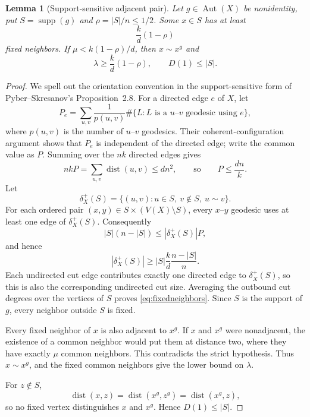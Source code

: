 \documentclass[11pt]{amsart}
\newtheorem{lemma}[theorem]{Lemma}
\theoremstyle{definition}
\newcommand{\supp}{\operatorname{supp}}
\newcommand{\dist}{\operatorname{dist}}
\newcommand{\Aut}{\operatorname{Aut}}
\begin{document}
\begin{lemma}[Support-sensitive adjacent pair]\label{lem:adjacent}
Let $g\in\Aut(X)$ be nonidentity, put $S=\supp(g)$ and $\rho=|S|/n\le1/2$.  Some $x\in S$ has at least
\begin{equation}\label{eq:fixedneighbors}
  \frac{k}{d}(1-\rho)
\end{equation}
fixed neighbors.  If $\mu<k(1-\rho)/d$, then $x\sim x^g$ and
\begin{equation}\label{eq:adjacentconsequences}
  \lambda\ge\frac{k}{d}(1-\rho),
  \qquad D(1)\le|S|.
\end{equation}
\end{lemma}

\begin{proof}
We spell out the orientation convention in the support-sensitive form of Pyber--Skresanov's Proposition~2.8.  For a directed edge $e$ of $X$, let
\[
 P_e=\sum_{u,v}\frac1{p(u,v)}
 \#\{L:L\text{ is a }u\text{--}v\text{ geodesic using }e\},
\]
where $p(u,v)$ is the number of $u$--$v$ geodesics.  Their coherent-configuration argument shows that $P_e$ is independent of the directed edge; write the common value as $P$.  Summing over the $nk$ directed edges gives
\[
 nkP=\sum_{u,v}\dist(u,v)\le dn^2,
 \qquad\text{so}\qquad P\le\frac{dn}{k}.
\]
Let
\[
 \delta_X^+(S)=\{(u,v):u\in S,\ v\notin S,\ u\sim v\}.
\]
For each ordered pair $(x,y)\in S\times(V(X)\setminus S)$, every $x$--$y$ geodesic uses at least one edge of $\delta_X^+(S)$.  Consequently
\[
 |S|(n-|S|)\le |\delta_X^+(S)|P,
\]
and hence
\begin{equation}\label{eq:boundary}
  |\delta_X^+(S)|\ge |S|\frac{k}{d}\frac{n-|S|}{n}.
\end{equation}
Each undirected cut edge contributes exactly one directed edge to $\delta_X^+(S)$, so this is also the corresponding undirected cut size.  Averaging the outbound cut degrees over the vertices of $S$ proves \eqref{eq:fixedneighbors}.  Since $S$ is the support of $g$, every neighbor outside $S$ is fixed.

Every fixed neighbor of $x$ is also adjacent to $x^g$.  If $x$ and $x^g$ were nonadjacent, the existence of a common neighbor would put them at distance two, where they have exactly $\mu$ common neighbors.  This contradicts the strict hypothesis.  Thus $x\sim x^g$, and the fixed common neighbors give the lower bound on $\lambda$.

For $z\notin S$,
\[
  \dist(x,z)=\dist(x^g,z^g)=\dist(x^g,z),
\]
so no fixed vertex distinguishes $x$ and $x^g$.  Hence $D(1)\le|S|$.
\end{proof}
\end{document}
